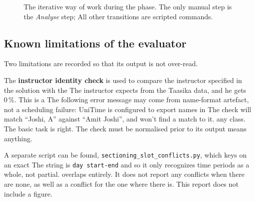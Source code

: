 \begin{figure}[H]
\centering
{}
\caption{ The iterative way of work during the phase. The only manual step is the \emph{Analyse} step;
All other transitions are scripted commands.}
\label{fig:loop}
\end{figure}

\subsection{Known limitations of the evaluator}

Two limitations are recorded so that its output is not over-read.

The \textbf{instructor identity check} is used to compare the instructor specified in the solution with the
The instructor expects from the Taasika data, and he gets 0\,\%. This is a
The following error message may come from name-format artefact, not a scheduling failure: UniTime is configured to export names in
The check will match ``Joshi, A'' against ``Amit Joshi'', and won't find a match to it.
any class. The basic task is right. The check must be normalised prior to its
output means anything.

A separate script can be found, \texttt{sectioning\_slot\_conflicts.py}, which keys on an exact
The string is \texttt{day start-end} and so it only recognizes time periods as a whole, not partial.
overlaps entirely. It does not report any conflicts when there are none, as well as a conflict for the one where there is.
This report does not include a figure.
